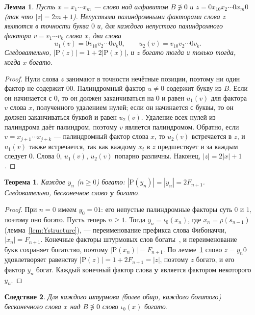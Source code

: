 \documentclass[a4paper,14pt]{extreport}
\theoremstyle{plain}
\newtheorem{theorem}{Теорема}[section]
\newtheorem{lemma}{Лемма}[section]
\newtheorem{corollary}[theorem]{Следствие}
\theoremstyle{definition}
\theoremstyle{remark}
\begin{document}
\begin{lemma}\label{lem:insertcount}
	Пусть $x=x_1\cdots x_m$ --- слово над алфавитом $B\not\ni0$ и $z=0x_10x_2\cdots0x_m0$ (так что $|z|=2m+1$).
	Непустыми палиндромными факторами слова $z$ являются в точности буква $0$ и, для каждого непустого палиндромного фактора
	$v=v_1\cdots v_k$ слова $x$, два слова
	\begin{equation}
		u_1(v)=0v_10v_2\cdots0v_k0,\qquad u_2(v)=v_10v_2\cdots0v_k .
	\end{equation}
	Следовательно, $|\mathrm P(z)|=1+2|\mathrm P(x)|$, и $z$ богато тогда и только тогда, когда $x$ богато.
\end{lemma}
\begin{proof}
	Нули слова $z$ занимают в точности нечётные позиции, поэтому ни один фактор не содержит $00$.
	Палиндромный фактор $u\ne0$ содержит букву из $B$. Если он начинается с $0$, то он должен заканчиваться на $0$ и равен
	$u_1(v)$ для фактора $v$ слова $x$, полученного удалением нулей; если он начинается с буквы, то он должен заканчиваться буквой
	и равен $u_2(v)$. Удаление всех нулей из палиндрома даёт палиндром, поэтому $v$ является палиндромом. Обратно, если $v=x_{j+1}\cdots x_{j+k}$ --- палиндромный фактор слова $x$,
	то $u_2(v)$ встречается в $z$, и $u_1(v)$ также встречается, так как каждому $x_t$ в $z$ предшествует и за каждым следует $0$.
	Слова $0$, $u_1(v)$, $u_2(v)$ попарно различны. Наконец, $|z|=2|x|+1$.
\end{proof}

\begin{theorem}\label{thm:Yrich}
	Каждое $y_n$ ($n\ge0$) богато: $|\mathrm P(y_n)|=|y_n|=2F_{n+1}$. Следовательно, бесконечное слово $\mathbf y$ богато.
\end{theorem}
\begin{proof}
	При $n=0$ имеем $y_0=01$: его непустые палиндромные факторы
суть $0$ и $1$, поэтому оно богато.
Пусть теперь $n\ge1$. Тогда $y_n=\iota_0(x_n)$, где
$x_n=\rho(s_{n-1})$ (лемма~\ref{lem:Ystructure}), ---
переименование префикса слова Фибоначчи, $|x_n|=F_{n+1}$.
	Конечные факторы штурмовых слов богаты~\cite{Droubay}, и переименование букв сохраняет богатство, поэтому $|\mathrm P(x_n)|=F_{n+1}$.
	По лемме~\ref{lem:insertcount} слово $z=y_n0$ удовлетворяет равенству $|\mathrm P(z)|=1+2F_{n+1}=|z|$, поэтому $z$ богато, и его фактор $y_n$ богат.
	Каждый конечный фактор слова $\mathbf y$ является фактором некоторого $y_n$.
\end{proof}

\begin{corollary}
	Для каждого штурмова (более общо, каждого богатого) бесконечного слова $x$ над $B\not\ni0$ слово $\iota_0(x)$ богато.
\end{corollary}
\end{document}
